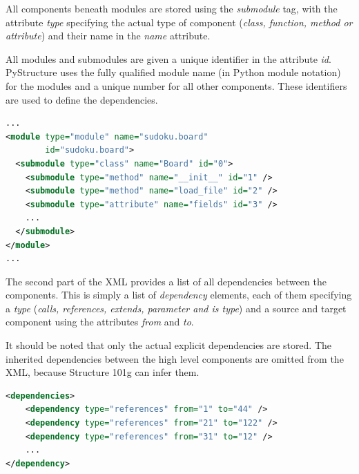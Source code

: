 \documentclass[12pt,halfparskip,DIV11,BCOR10mm]{scrreprt}
\begin{document}
All components beneath modules are stored using the \emph{submodule} tag, with the attribute \emph{type} specifying the actual type of component (\emph{class, function, method or attribute}) and their name in the \emph{name} attribute.

All modules and submodules are given a unique identifier in the attribute \emph{id}. PyStructure uses the fully qualified module name (in Python module notation) for the modules and a unique number for all other components. These identifiers are used to define the dependencies.

\begin{lstlisting}[language=xml]
...
<module type="module" name="sudoku.board" 
        id="sudoku.board">
  <submodule type="class" name="Board" id="0">
    <submodule type="method" name="__init__" id="1" />
    <submodule type="method" name="load_file" id="2" />
    <submodule type="attribute" name="fields" id="3" />
    ...
  </submodule>
</module>
...
\end{lstlisting}

The second part of the XML provides a list of all dependencies between the components. This is simply a list of \emph{dependency} elements, each of them specifying a \emph{type} (\emph{calls, references, extends, parameter and is type}) and a source and target component using the attributes \emph{from} and \emph{to}.

It should be noted that only the actual explicit dependencies are stored. The inherited dependencies between the high level components are omitted from the XML, because Structure 101g can infer them.

\begin{lstlisting}[language=xml]
<dependencies>
    <dependency type="references" from="1" to="44" />
    <dependency type="references" from="21" to="122" />
    <dependency type="references" from="31" to="12" />
    ...
</dependency>
\end{lstlisting}


 
\end{document}
